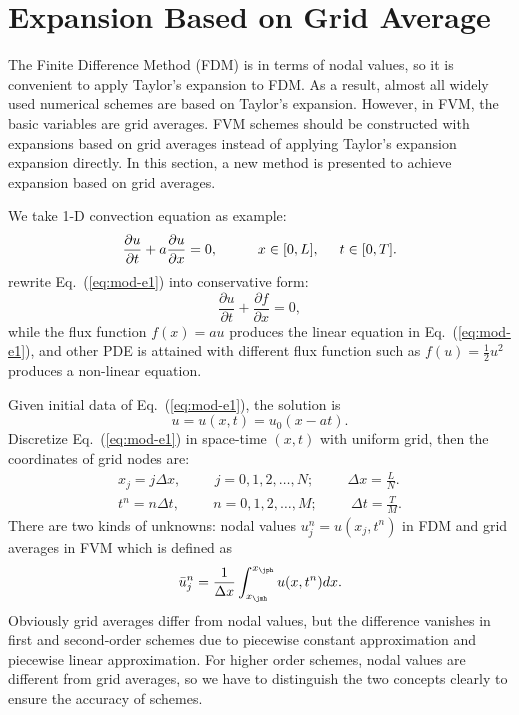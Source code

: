 \documentclass[]{article}
\newcommand{\diff}{d}
\begin{document}
\section{Expansion Based on Grid Average}
\label{sec:expansion-based-grid}

The Finite Difference Method (FDM) is in terms of nodal values,
so it is convenient to apply Taylor's expansion to FDM. As a result,
almost all widely used numerical schemes are based on Taylor's expansion. 
However, in FVM, the basic variables are grid averages.  FVM schemes should
be constructed with expansions based on grid averages
instead of applying Taylor's expansion expansion directly. 
In this section, a new method is presented to achieve expansion based on grid
averages.

We take 1-D convection equation as example:
\begin{equation}
    \dfrac{\partial u}{\partial t}+a\dfrac{\partial
    u}{\partial x}=0,\hspace{1cm}x\in [0,L],\hspace{5mm} t\in [0,T].
    \label{eq:mod-e1} 
\end{equation}
rewrite Eq.~(\ref{eq:mod-e1}) into conservative form:
\begin{equation}
    \dfrac{\partial u}{\partial t}+\dfrac{\partial f
    }{\partial x}=0,
    \label{eq:conservative-convection}
\end{equation}
while the flux function $f(x) =au$ produces the linear equation in
Eq.~(\ref{eq:mod-e1}), and other PDE is attained with different flux
function such as $f(u) = \frac 12 u^2$ produces a non-linear equation.

Given initial data of Eq.~(\ref{eq:mod-e1}), the solution is
\begin{equation*}
    u = u(x,t) = u_0(x-at).
\end{equation*}
Discretize Eq.~(\ref{eq:mod-e1}) in space-time $(x, t)$ with uniform grid,
then the coordinates of grid nodes are:
\begin{align*}
    x_j=j \Delta x,\hspace{1cm} j=0,1,2,\ldots,N;\hspace{1cm} \Delta x
    =\frac{L}{N}. \\
    t^n = n\Delta t,\hspace{1cm} n=0,1,2,\ldots,M;\hspace{1cm} \Delta t
    =\frac{T}{M}.
\end{align*}
There are two kinds of unknowns: nodal values $u^n_j=u(x_j,t^n)$ in FDM
and grid averages in FVM which is defined as
\begin{equation}
    \bar u_{j}^n = \frac{1}{\Delta x}\int_{x_{\jmh}}^{x_{\jph}}
    u(x,t^n)\diff x.
    \label{eq:def_grid_avg}
\end{equation}
Obviously grid averages differ from nodal values, but the difference
vanishes in first and second-order schemes due to piecewise constant
approximation and piecewise linear approximation. For higher order
schemes, nodal values are different from grid averages, so we have to
distinguish the two concepts clearly to ensure the accuracy of
schemes.
\end{document}
